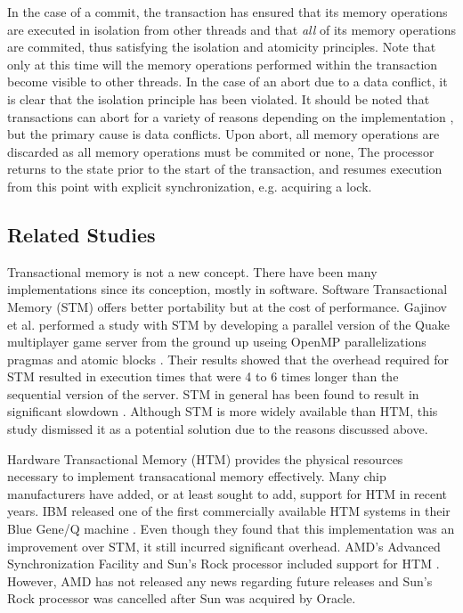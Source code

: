 \documentclass[a4paper]{article}
\begin{document}
\indent In the case of a commit, the transaction has ensured that its memory
operations are executed in isolation from other threads and that \textit{all} of its
memory operations are commited, thus satisfying the isolation and
atomicity principles.  Note that only at this time will the memory operations
performed within the transaction become visible to other threads.  In the case
of an abort due to a data conflict, it is clear that the isolation principle has
been violated.  It should be noted that transactions can abort for a variety of
reasons depending on the implementation \cite{intel_opt_man,chung_amd}, but the
primary cause is data conflicts.  Upon abort, all memory operations are
discarded as all memory operations must be commited or none,  The
processor returns to the state prior to the start of the transaction, and
resumes execution from this point with explicit synchronization, e.g. acquiring
a lock.\par

\subsection{\textbf{Related Studies}}

\indent Transactional memory is not a new concept.  There have been many
implementations since its conception, mostly in software.  Software
Transactional Memory (STM) offers better portability but at the cost of
performance.  Gajinov et al. performed a study with STM by developing a parallel
version of the Quake multiplayer game server from the ground up useing OpenMP
parallelizations pragmas and atomic blocks \cite{quake_stm}.  Their results
showed that the overhead required for STM resulted in execution times that were
4 to 6 times longer than the sequential version of the server.  STM in general
has been found to result in significant slowdown \cite{stm_cascaval}.  Although
STM is more widely available than HTM, this study dismissed it as a potential
solution due to the reasons discussed above.\par

\indent Hardware Transactional Memory (HTM) provides the physical resources
necessary to implement transacational memory effectively.  Many chip manufacturers
have added, or at least sought to add, support for HTM in recent years.  IBM
released one of the first commercially available HTM systems in their Blue
Gene/Q machine \cite{blue_wang}.  Even though they found that this
implementation was an improvement over STM, it still incurred significant
overhead.  AMD's Advanced Synchronization Facility and Sun's Rock processor
included support for HTM \cite{chung_amd,rock_dice}.  However, AMD has not
released any news regarding future releases and Sun's Rock processor was
cancelled after Sun was acquired by Oracle.\par
\end{document}
